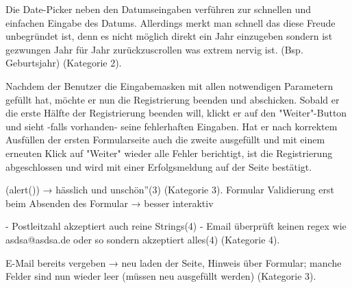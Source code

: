 {
Die Date-Picker neben den Datumseingaben verführen zur schnellen und einfachen Eingabe des Datums. Allerdings
merkt man schnell das diese Freude unbegründet ist, denn es nicht möglich direkt ein Jahr einzugeben sondern ist gezwungen Jahr für
Jahr zurückzuscrollen was extrem nervig ist. (Bsp. Geburtsjahr)
}
{  (Kategorie 2).
}
{
}





Nachdem der Benutzer die Eingabemasken mit allen notwendigen Parametern gefüllt hat, möchte er nun die Registrierung beenden und abschicken. Sobald
er die erste Hälfte der Registrierung beenden will, klickt er auf den "Weiter"-Button und sieht -falls vorhanden- seine fehlerhaften Eingaben. Hat er nach korrektem
Ausfüllen der ersten Formularseite auch die zweite ausgefüllt und mit einem erneuten Klick auf "Weiter" wieder alle Fehler berichtigt, ist die Registrierung abgeschlossen
und wird mit einer Erfolgsmeldung auf der Seite bestätigt.

{
(alert()) → hässlich und unschön”(3)
}
{  (Kategorie 3).
}
{
Formular Validierung erst beim Absenden des Formular → besser interaktiv
}

{
	- Postleitzahl akzeptiert auch reine Strings(4)
	- Email überprüft keinen regex wie asdsa@asdsa.de oder so sondern akzeptiert alles(4)
}
{  (Kategorie 4).}
{
} 

{
E-Mail bereits vergeben → neu laden der Seite, Hinweis über Formular; manche Felder sind nun wieder leer (müssen neu ausgefüllt werden)
}
{  (Kategorie 3).
}
{
}  
